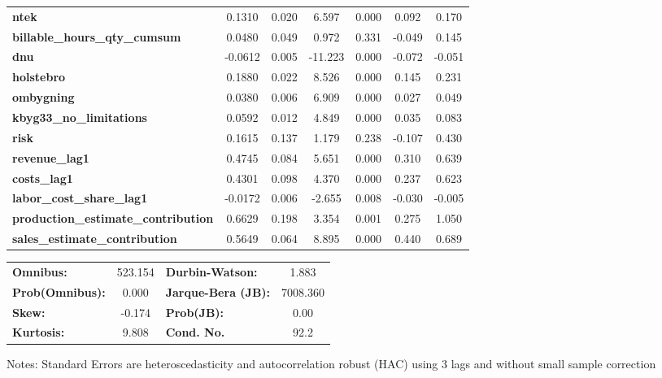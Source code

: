 \begin{center}
\begin{tabular}{lcccccc}
\textbf{ntek}                               &       0.1310  &        0.020     &     6.597  &         0.000        &        0.092    &        0.170     \\
\textbf{billable\_hours\_qty\_cumsum}       &       0.0480  &        0.049     &     0.972  &         0.331        &       -0.049    &        0.145     \\
\textbf{dnu}                                &      -0.0612  &        0.005     &   -11.223  &         0.000        &       -0.072    &       -0.051     \\
\textbf{holstebro}                          &       0.1880  &        0.022     &     8.526  &         0.000        &        0.145    &        0.231     \\
\textbf{ombygning}                          &       0.0380  &        0.006     &     6.909  &         0.000        &        0.027    &        0.049     \\
\textbf{kbyg33\_no\_limitations}            &       0.0592  &        0.012     &     4.849  &         0.000        &        0.035    &        0.083     \\
\textbf{risk}                               &       0.1615  &        0.137     &     1.179  &         0.238        &       -0.107    &        0.430     \\
\textbf{revenue\_lag1}                      &       0.4745  &        0.084     &     5.651  &         0.000        &        0.310    &        0.639     \\
\textbf{costs\_lag1}                        &       0.4301  &        0.098     &     4.370  &         0.000        &        0.237    &        0.623     \\
\textbf{labor\_cost\_share\_lag1}           &      -0.0172  &        0.006     &    -2.655  &         0.008        &       -0.030    &       -0.005     \\
\textbf{production\_estimate\_contribution} &       0.6629  &        0.198     &     3.354  &         0.001        &        0.275    &        1.050     \\
\textbf{sales\_estimate\_contribution}      &       0.5649  &        0.064     &     8.895  &         0.000        &        0.440    &        0.689     \\
\bottomrule
\end{tabular}
\begin{tabular}{lclc}
\textbf{Omnibus:}       & 523.154 & \textbf{  Durbin-Watson:     } &    1.883  \\
\textbf{Prob(Omnibus):} &   0.000 & \textbf{  Jarque-Bera (JB):  } & 7008.360  \\
\textbf{Skew:}          &  -0.174 & \textbf{  Prob(JB):          } &     0.00  \\
\textbf{Kurtosis:}      &   9.808 & \textbf{  Cond. No.          } &     92.2  \\
\bottomrule
\end{tabular}
\end{center}

Notes: \newline
 [1] Standard Errors are heteroscedasticity and autocorrelation robust (HAC) using 3 lags and without small sample correction